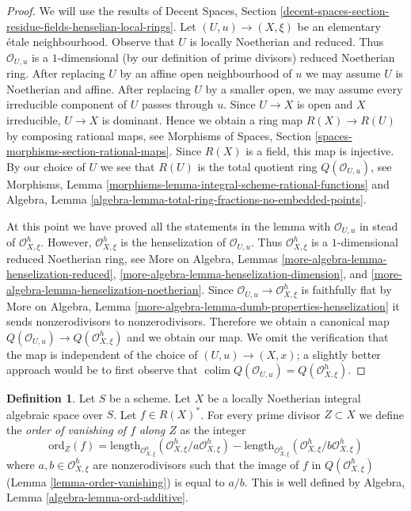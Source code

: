 \documentclass{stacks-project}
\theoremstyle{plain}
\theoremstyle{definition}
\newtheorem{definition}[subsection]{Definition}
\theoremstyle{remark}
\numberwithin{equation}{subsection}
\def\colim{\mathop{\mathrm{colim}}\nolimits}
\begin{document}
\begin{proof}
We will use the results of Decent Spaces, Section
\ref{decent-spaces-section-residue-fields-henselian-local-rings}.
Let $(U, u) \to (X, \xi)$ be an elementary \'etale neighbourhood.
Observe that $U$ is locally Noetherian and reduced.
Thus $\mathcal{O}_{U, u}$ is a $1$-dimensional
(by our definition of prime divisors)
reduced Noetherian ring.
After replacing $U$ by an affine open neighbourhood of $u$
we may assume $U$ is Noetherian and affine.
After replacing $U$ by a smaller open, we may assume every irreducible
component of $U$ passes through $u$.
Since $U \to X$ is open and $X$ irreducible, $U \to X$ is dominant.
Hence we obtain a ring map $R(X) \to R(U)$ by composing rational maps, see
Morphisms of Spaces, Section \ref{spaces-morphisms-section-rational-maps}.
Since $R(X)$ is a field, this map is injective.
By our choice of $U$ we see that $R(U)$ is the total quotient
ring $Q(\mathcal{O}_{U, u})$, see
Morphisms, Lemma \ref{morphisms-lemma-integral-scheme-rational-functions}
and
Algebra, Lemma \ref{algebra-lemma-total-ring-fractions-no-embedded-points}.

\medskip\noindent
At this point we have proved all the statements in the lemma with
$\mathcal{O}_{U, u}$ in stead of $\mathcal{O}_{X, \xi}^h$.
However, $\mathcal{O}_{X, \xi}^h$ is the henselization of
$\mathcal{O}_{U, u}$. Thus $\mathcal{O}_{X, \xi}^h$ is a $1$-dimensional
reduced Noetherian ring, see
More on Algebra, Lemmas
\ref{more-algebra-lemma-henselization-reduced},
\ref{more-algebra-lemma-henselization-dimension}, and
\ref{more-algebra-lemma-henselization-noetherian}.
Since $\mathcal{O}_{U, u} \to \mathcal{O}_{X, \xi}^h$ is
faithfully flat by More on Algebra, Lemma
\ref{more-algebra-lemma-dumb-properties-henselization}
it sends nonzerodivisors to nonzerodivisors.
Therefore we obtain a canonical map
$Q(\mathcal{O}_{U, u}) \to Q(\mathcal{O}_{X, \xi}^h)$
and we obtain our map.
We omit the verification that the map is independent of
the choice of $(U, u) \to (X, x)$; a slightly better
approach would be to first observe that
$\colim Q(\mathcal{O}_{U, u}) = Q(\mathcal{O}_{X, \xi}^h)$.
\end{proof}

\begin{definition}
\label{definition-order-vanishing}
Let $S$ be a scheme. Let $X$ be a locally Noetherian integral algebraic
space over $S$. Let $f \in R(X)^*$. For every prime divisor
$Z \subset X$ we define the {\it order of vanishing of $f$ along $Z$}
as the integer
$$
\text{ord}_Z(f) =
\text{length}_{\mathcal{O}_{X, \xi}^h}
(\mathcal{O}_{X, \xi}^h/a \mathcal{O}_{X, \xi}^h) -
\text{length}_{\mathcal{O}_{X, \xi}^h}
(\mathcal{O}_{X, \xi}^h/b \mathcal{O}_{X, \xi}^h)
$$
where $a, b \in \mathcal{O}_{X, \xi}^h$ are nonzerodivisors
such that the image of $f$ in $Q(\mathcal{O}_{X, \xi}^h)$
(Lemma \ref{lemma-order-vanishing}) is equal to $a/b$.
This is well defined by
Algebra, Lemma \ref{algebra-lemma-ord-additive}.
\end{definition}
\end{document}
